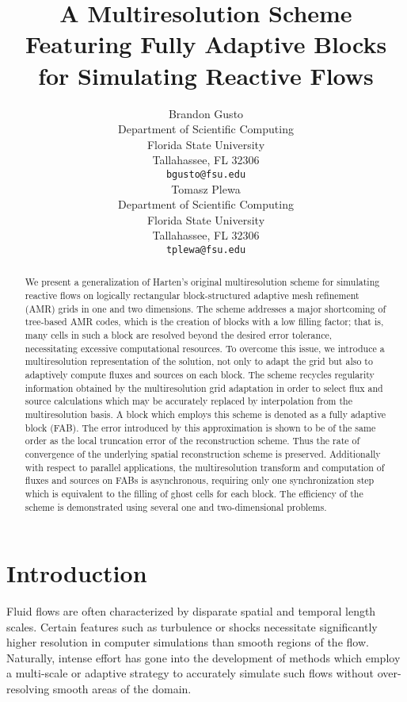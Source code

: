 \documentclass[12pt,letterpaper]{article}
\title{A Multiresolution Scheme Featuring Fully Adaptive Blocks for Simulating Reactive Flows}
\author{
  Brandon Gusto\\
  Department of Scientific Computing\\
  Florida State University\\
  Tallahassee, FL 32306 \\
  \texttt{bgusto@fsu.edu} \\
  \And
  Tomasz Plewa \\
  Department of Scientific Computing\\
  Florida State University\\
  Tallahassee, FL 32306 \\
  \texttt{tplewa@fsu.edu} \\
}
\begin{document}
\maketitle

\begin{abstract}
    We present a generalization of Harten's original multiresolution scheme for
    simulating reactive flows on logically rectangular block-structured adaptive
    mesh refinement (AMR) grids in one and two dimensions. The scheme addresses
    a major shortcoming of tree-based AMR codes, which is the creation of blocks
    with a low filling factor; that is, many cells in such a block are resolved
    beyond the desired error tolerance, necessitating excessive computational
    resources.  To overcome this issue, we introduce a multiresolution
    representation of the solution, not only to adapt the grid but also to
    adaptively compute fluxes and sources on each block. The scheme recycles
    regularity information obtained by the multiresolution grid adaptation in
    order to select flux and source calculations which may be accurately
    replaced by interpolation from the multiresolution basis. A block which
    employs this scheme is denoted as a fully adaptive block (FAB).  The error
    introduced by this approximation is shown to be of the same order as the
    local truncation error of the reconstruction scheme. Thus the rate of
    convergence of the underlying spatial reconstruction scheme is preserved.
    Additionally with respect to parallel applications, the multiresolution
    transform and computation of fluxes and sources on FABs is asynchronous,
    requiring only one synchronization step which is equivalent to the filling
    of ghost cells for each block. The efficiency of the scheme is demonstrated
    using several one and two-dimensional problems.
\end{abstract}


\section{Introduction}

    Fluid flows are often characterized by disparate spatial and temporal length
    scales. Certain features such as turbulence or shocks necessitate
    significantly higher resolution in computer simulations than smooth regions
    of the flow.  Naturally, intense effort has gone into the development of
    methods which employ a multi-scale or adaptive strategy to accurately
    simulate such flows without over-resolving smooth areas of the domain.
\end{document}
